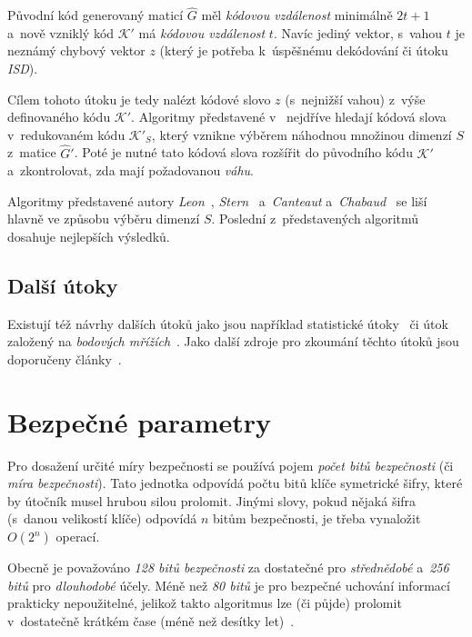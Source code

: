 \documentclass[thesis=M,czech,hidelinks]{FITthesis}[2012/06/26]
\newcommand{\0}{{\textcolor[gray]{0.75}{0}}}
\begin{document}
Původní kód generovaný maticí $\hat{G}$ měl \emph{kódovou vzdálenost} minimálně
$2t+1$ a~nově vzniklý kód $\mathcal{K}'$ má \emph{kódovou vzdálenost} $t$. Navíc
jediný vektor, s~vahou $t$ je neznámý chybový vektor $z$ (který je potřeba
k~úspěšnému dekódování či útoku \emph{ISD}).

Cílem tohoto útoku je tedy nalézt kódové slovo $z$ (s~nejnižší vahou) z~výše
definovaného kódu $\mathcal{K}'$. Algoritmy představené
v~\cite{Leon,Stern,Canteaut} nejdříve hledají kódová slova v~redukovaném kódu
$\mathcal{K}'_S$, který vznikne výběrem náhodnou množinou dimenzí $S$ z~matice
$\hat{G}'$. Poté je nutné tato kódová slova rozšířit do původního kódu
$\mathcal{K}'$ a~zkontrolovat, zda mají požadovanou \emph{váhu}.


Algoritmy představené autory \emph{Leon}~\cite{Leon}, \emph{Stern}~\cite{Stern}
a~\emph{Canteaut} a~\emph{Chabaud}~\cite{Canteaut} se liší hlavně ve způsobu
výběru dimenzí $S$. Poslední z~představených algoritmů dosahuje nejlepších
výsledků.


\subsection{Další útoky}

Existují též návrhy dalších útoků jako jsou například statistické
útoky~\cite{Jabri} či útok založený na \emph{bodových mřížích}~\cite{Brickell}.
Jako další zdroje pro zkoumání těchto útoků jsou doporučeny
články~\cite{Repka,Engelbert}.



\section{Bezpečné parametry}\label{kap_bezpecne_parametry}

Pro dosažení určité míry bezpečnosti se používá pojem \emph{počet bitů
bezpečnosti} (či \emph{míra bezpečnosti}). Tato jednotka odpovídá počtu bitů
klíče symetrické šifry, které by útočník musel hrubou silou prolomit. Jinými
slovy, pokud nějaká šifra (s~danou velikostí klíče) odpovídá $n$ bitům
bezpečnosti, je třeba vynaložit $O\left(2^n\right)$ operací.

Obecně je považováno \emph{128 bitů bezpečnosti} za dostatečné pro
\emph{střednědobé} a~\emph{256 bitů} pro \emph{dlouhodobé} účely. Méně než
\emph{80 bitů} je pro bezpečné uchování informací prakticky nepoužitelné,
jelikož takto  algoritmus lze (či půjde) prolomit v~dostatečně krátkém
čase (méně než desítky let)~\cite{Paar}.
\end{document}
